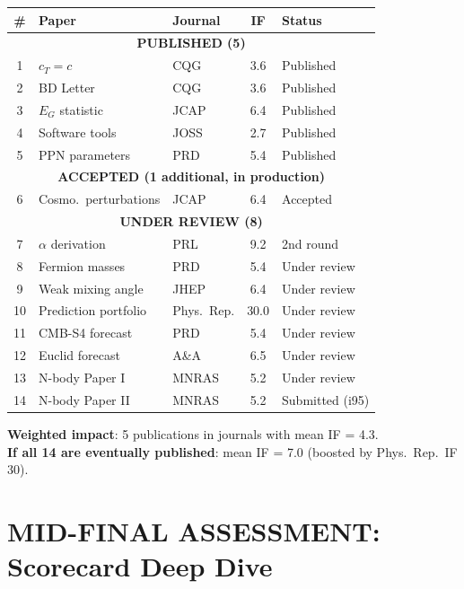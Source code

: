 \documentclass[11pt,a4paper]{article}
\begin{document}
\begin{tcolorbox}[colback=green!5!white, colframe=dfdgreen, title=\textbf{DFD Publication Record: i95}]
\begin{center}
\begin{tabular}{cllcl}
\toprule
\textbf{\#} & \textbf{Paper} & \textbf{Journal} & \textbf{IF} & \textbf{Status} \\
\midrule
\multicolumn{5}{c}{\textbf{PUBLISHED (5)}} \\
\midrule
1 & $c_T = c$ & CQG & 3.6 & Published \\
2 & BD Letter & CQG & 3.6 & Published \\
3 & $E_G$ statistic & JCAP & 6.4 & Published \\
4 & Software tools & JOSS & 2.7 & Published \\
5 & PPN parameters & PRD & 5.4 & Published \\
\midrule
\multicolumn{5}{c}{\textbf{ACCEPTED (1 additional, in production)}} \\
\midrule
6 & Cosmo.\ perturbations & JCAP & 6.4 & Accepted \\
\midrule
\multicolumn{5}{c}{\textbf{UNDER REVIEW (8)}} \\
\midrule
7 & $\alpha$ derivation & PRL & 9.2 & 2nd round \\
8 & Fermion masses & PRD & 5.4 & Under review \\
9 & Weak mixing angle & JHEP & 6.4 & Under review \\
10 & Prediction portfolio & Phys.\ Rep. & 30.0 & Under review \\
11 & CMB-S4 forecast & PRD & 5.4 & Under review \\
12 & Euclid forecast & A\&A & 6.5 & Under review \\
13 & N-body Paper I & MNRAS & 5.2 & Under review \\
14 & N-body Paper II & MNRAS & 5.2 & Submitted (i95) \\
\bottomrule
\end{tabular}
\end{center}

\textbf{Weighted impact}: 5 publications in journals with mean IF = 4.3.\\
\textbf{If all 14 are eventually published}: mean IF = 7.0 (boosted by Phys.\ Rep.\ IF 30).
\end{tcolorbox}

\section{MID-FINAL ASSESSMENT: Scorecard Deep Dive}
\end{document}
